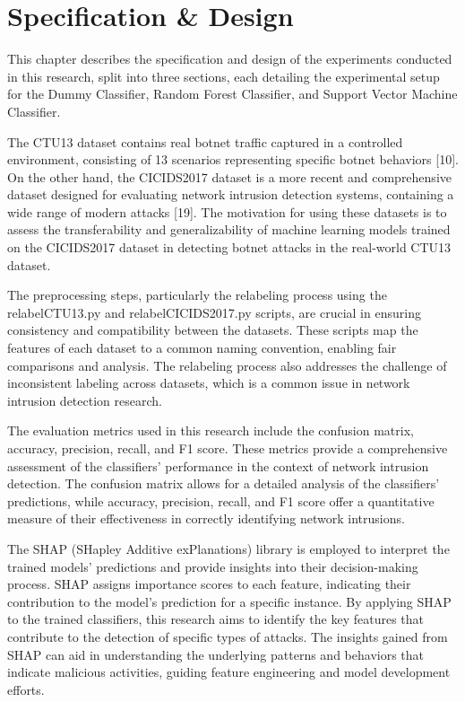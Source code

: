 \chapter{Specification \& Design}

This chapter describes the specification and design of the experiments conducted in this research, split into three sections, each detailing the experimental setup for the Dummy Classifier, Random Forest Classifier, and Support Vector Machine Classifier.

The CTU13 dataset contains real botnet traffic captured in a controlled environment, consisting of 13 scenarios representing specific botnet behaviors [10]. On the other hand, the CICIDS2017 dataset is a more recent and comprehensive dataset designed for evaluating network intrusion detection systems, containing a wide range of modern attacks [19]. The motivation for using these datasets is to assess the transferability and generalizability of machine learning models trained on the CICIDS2017 dataset in detecting botnet attacks in the real-world CTU13 dataset.

The preprocessing steps, particularly the relabeling process using the relabelCTU13.py and relabelCICIDS2017.py scripts, are crucial in ensuring consistency and compatibility between the datasets. These scripts map the features of each dataset to a common naming convention, enabling fair comparisons and analysis. The relabeling process also addresses the challenge of inconsistent labeling across datasets, which is a common issue in network intrusion detection research.

The evaluation metrics used in this research include the confusion matrix, accuracy, precision, recall, and F1 score. These metrics provide a comprehensive assessment of the classifiers' performance in the context of network intrusion detection. The confusion matrix allows for a detailed analysis of the classifiers' predictions, while accuracy, precision, recall, and F1 score offer a quantitative measure of their effectiveness in correctly identifying network intrusions.

The SHAP (SHapley Additive exPlanations) library is employed to interpret the trained models' predictions and provide insights into their decision-making process. SHAP assigns importance scores to each feature, indicating their contribution to the model's prediction for a specific instance. By applying SHAP to the trained classifiers, this research aims to identify the key features that contribute to the detection of specific types of attacks. The insights gained from SHAP can aid in understanding the underlying patterns and behaviors that indicate malicious activities, guiding feature engineering and model development efforts.

